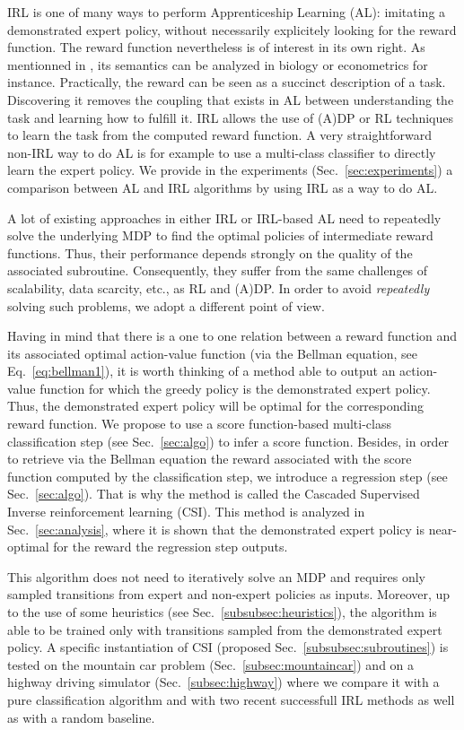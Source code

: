 \documentclass[smallextended]{svjour3}
\begin{document}
IRL is one of many ways to perform Apprenticeship Learning (AL): imitating a demonstrated expert policy, without necessarily explicitely looking for the reward function. The reward function nevertheless is of interest in its own right. As mentionned in \cite{russell1998learning}, its semantics can be analyzed in biology or econometrics for instance. Practically, the reward can be seen as a succinct description of a task. Discovering it removes the coupling that exists in AL between understanding the task and learning how to fulfill it. IRL allows the use of (A)DP or RL techniques to learn the task from the computed reward function. A very straightforward non-IRL way to do AL is for example to use a multi-class classifier to directly learn the expert policy. We provide in the experiments (Sec.~\ref{sec:experiments}) a comparison between AL and IRL algorithms by using IRL as a way to do AL.

A lot of existing approaches in either IRL or IRL-based AL need to repeatedly solve the underlying MDP to find the optimal policies of intermediate reward functions. Thus, their performance depends strongly on the quality of the associated subroutine. Consequently, they suffer from the same challenges of scalability, data scarcity, etc., as RL and (A)DP. In order to avoid \emph{repeatedly} solving such problems, we adopt a different point of view.

Having in mind that there is a one to one relation between a reward function and its associated optimal action-value function (via the Bellman equation, see Eq.~\eqref{eq:bellman1}), it is worth thinking of a method able to output an action-value function for which the greedy policy is the demonstrated expert policy. Thus, the demonstrated expert policy will be optimal for the corresponding reward function. We propose to use a score function-based multi-class classification step (see Sec.~\ref{sec:algo}) to infer a score function. Besides, in order to retrieve via the Bellman equation the reward associated with the score function computed by the classification step, we introduce a regression step (see Sec.~\ref{sec:algo}). That is why the method is called the Cascaded Supervised Inverse reinforcement learning (CSI). This method is analyzed in Sec.~\ref{sec:analysis}, where it is shown that the demonstrated expert policy is near-optimal for the reward the regression step outputs.

This algorithm does not need to iteratively solve an MDP and requires only sampled transitions from expert and non-expert policies as inputs. Moreover, up to the use of some heuristics (see Sec.~\ref{subsubsec:heuristics}), the algorithm is able to be trained only with transitions sampled from the demonstrated expert policy. A specific instantiation of CSI (proposed Sec.~\ref{subsubsec:subroutines}) is tested on the mountain car problem (Sec.~\ref{subsec:mountaincar}) and on a highway driving simulator (Sec.~\ref{subsec:highway}) where we compare it with a pure classification algorithm \cite{taskar2005learning} and with two recent successfull IRL methods \cite{klein2012scirl} as well as with a random baseline.
\end{document}
